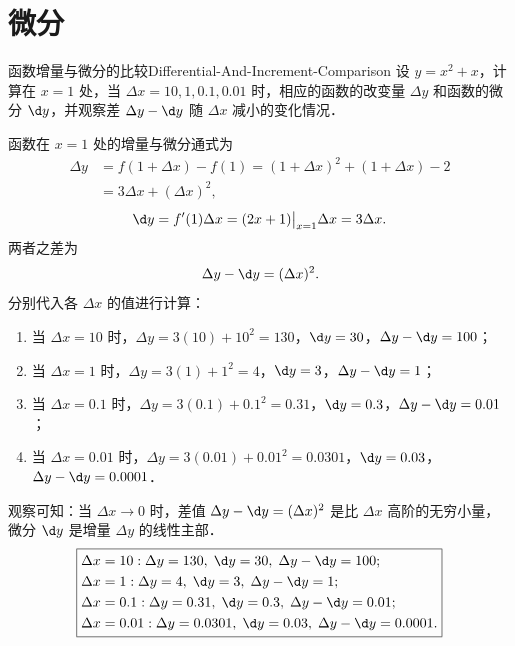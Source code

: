 \section{微分}

\begin{problem}{函数增量与微分的比较}{Differential-And-Increment-Comparison}
    设 $y = x^2 + x$，计算在 $x = 1$ 处，当 $\Delta x = 10, 1, 0.1, 0.01$ 时，相应的函数的改变量 $\Delta y$ 和函数的微分 $\d y$，并观察差 $\Delta y - \d y$ 随 $\Delta x$ 减小的变化情况．
\end{problem}

\begin{solution}
    函数在 $x = 1$ 处的增量与微分通式为
    \begin{equation}
        \begin{aligned}
            \Delta y & = f(1 + \Delta x) - f(1) = (1 + \Delta x)^2 + (1 + \Delta x) - 2 \\
                     & = 3\Delta x + (\Delta x)^2,
        \end{aligned}
    \end{equation}
    \begin{equation}
        \d y = f'(1)\Delta x = (2x + 1)\big|_{x=1} \Delta x = 3\Delta x.
    \end{equation}
    两者之差为
    \begin{equation}
        \Delta y - \d y = (\Delta x)^2.
    \end{equation}
    分别代入各 $\Delta x$ 的值进行计算：
    \begin{enumerate}
        \item 当 $\Delta x = 10$ 时，$\Delta y = 3(10) + 10^2 = 130$，$\d y = 30$，$\Delta y - \d y = 100$；
        \item 当 $\Delta x = 1$ 时，$\Delta y = 3(1) + 1^2 = 4$，$\d y = 3$，$\Delta y - \d y = 1$；
        \item 当 $\Delta x = 0.1$ 时，$\Delta y = 3(0.1) + 0.1^2 = 0.31$，$\d y = 0.3$，$\Delta y - \d y = 0.01$；
        \item 当 $\Delta x = 0.01$ 时，$\Delta y = 3(0.01) + 0.01^2 = 0.0301$，$\d y = 0.03$，$\Delta y - \d y = 0.0001$．
    \end{enumerate}
    观察可知：当 $\Delta x \to 0$ 时，差值 $\Delta y - \d y = (\Delta x)^2$ 是比 $\Delta x$ 高阶的无穷小量，微分 $\d y$ 是增量 $\Delta y$ 的线性主部．
    \begin{equation}
        \boxed{
            \begin{aligned}
                 & \Delta x = 10: \Delta y = 130, \; \d y = 30, \; \Delta y - \d y = 100;           \\
                 & \Delta x = 1: \Delta y = 4, \; \d y = 3, \; \Delta y - \d y = 1;                 \\
                 & \Delta x = 0.1: \Delta y = 0.31, \; \d y = 0.3, \; \Delta y - \d y = 0.01;       \\
                 & \Delta x = 0.01: \Delta y = 0.0301, \; \d y = 0.03, \; \Delta y - \d y = 0.0001.
            \end{aligned}
        }
    \end{equation}
\end{solution}

